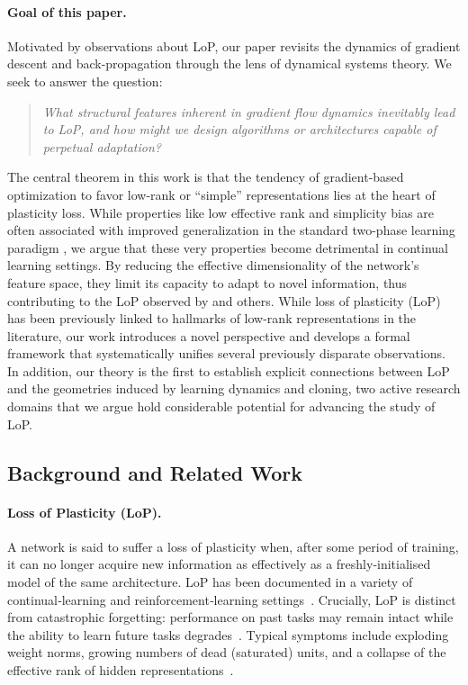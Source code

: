 \documentclass{article}
\numberwithin{figure}{section}
\begin{document}
\paragraph{Goal of this paper.}
Motivated by observations about LoP, our paper revisits the dynamics of gradient descent and back-propagation through the lens of dynamical systems theory. We seek to answer the question:
\begin{quote}
\emph{What structural features inherent in gradient flow dynamics inevitably lead to LoP, and how might we design algorithms or architectures capable of perpetual adaptation?}
\end{quote}
The central theorem in this work is that the tendency of gradient-based optimization to favor low-rank or ``simple'' representations lies at the heart of plasticity loss. While properties like low effective rank and simplicity bias are often associated with improved generalization in the standard two-phase learning paradigm \citep{huh2022lowrank, papyan2020prevalence, zhang2017understanding}, we argue that these very properties become detrimental in continual learning settings. By reducing the effective dimensionality of the network's feature space, they limit its capacity to adapt to novel information, thus contributing to the LoP observed by \citep{dohare2024loss} and others. While loss of plasticity (LoP) has been previously linked to hallmarks of low-rank representations in the literature, our work introduces a novel perspective and develops a formal framework that systematically unifies several previously disparate observations. In addition, our theory is the first to establish explicit connections between LoP and the geometries induced by learning dynamics and cloning, two active research domains that we argue hold considerable potential for advancing the study of LoP.
\subsection{Background and Related Work}%
\label{sec:background}

\paragraph{Loss of Plasticity (LoP).}  
A network is said to suffer a {loss of plasticity} when, after some period of training, it can no longer acquire new information as effectively as a freshly‑initialised model of the same architecture.  LoP has been documented in a variety of continual‑learning and reinforcement‑learning settings~\citep{dohare2024loss,nikishin2022primacy}.  Crucially, LoP is distinct from catastrophic forgetting: performance on {past} tasks may remain intact while the ability to learn {future} tasks degrades~\citep{lyle2023understanding}.  Typical symptoms include exploding weight norms, growing numbers of dead (saturated) units, and a collapse of the effective rank of hidden representations~\citep{dohare2021continual,papyan2020prevalence}.
\end{document}
